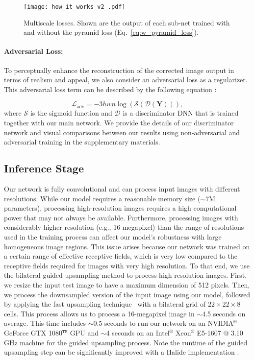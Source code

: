 \documentclass[final]{cvpr}
\begin{document}
\begin{figure}[b]
\centering
\texttt{[image: how\_it\_works\_v2\_.pdf]}
\vspace{-6mm}
\caption{Multiscale losses. Shown are the output of each sub-net trained with and without the pyramid loss (Eq.\ \ref{eq:w_pyramid_loss}).}
\label{fig:how_it_works}
\end{figure}

\paragraph{Adversarial Loss:} To perceptually enhance the reconstruction of the corrected image output in terms of realism and appeal, we also consider an adversarial loss as a regularizer.
This adversarial loss term can be described by the following equation \cite{goodfellow2014generative}:

\begin{equation}
\label{eq:w_adv_loss}
\mathcal{L}_{\text{adv}} = -3hwn \log\left(\mathcal{S}\left(\mathcal{D}\left(\mathbf{Y}\right)\right)\right),
\end{equation}
where $\mathcal{S}$ is the sigmoid function and $\mathcal{D}$ is a discriminator DNN that is trained together with our main network. We provide the details of our discriminator network and visual comparisons between our results using non-adversarial and adversarial training in the supplementary materials.

\subsection{Inference Stage}\label{subsec:Inference}

Our network is fully convolutional and can process input images with different resolutions. While our model requires a reasonable memory size ($\sim$7M parameters), processing high-resolution images requires a high computational power that may not always be available. Furthermore, processing images with considerably higher resolution (e.g., 16-megapixel) than the range of resolutions used in the training process can affect our model's robustness with large homogeneous image regions. This issue arises because our network was trained on a certain range of effective receptive fields, which is very low compared to the receptive fields required for images with very high resolution. To that end, we use the bilateral guided upsampling method \cite{chen2016bilateral} to process high-resolution images. First, we resize the input test image to have a maximum dimension of 512 pixels. Then, we process the downsampled version of the input image using our model, followed by applying the fast upsampling technique~\cite{chen2016bilateral} with a bilateral grid of $22\!\times\!22\!\times\!8$ cells. This process allows us to process a 16-megapixel image in $\sim$4.5 seconds on average. This time includes $\sim$0.5 seconds to run our network on an NVIDIA$^\circledR$ GeForce GTX 1080$^\texttt{TM}$ GPU and $\sim$4 seconds on an Intel$^\circledR$ Xeon$^\circledR$ E5-1607 @ 3.10 GHz machine for the guided upsampling process. Note the runtime of the guided upsampling step can be significantly improved with a Halide implementation \cite{HALIDE}.
\end{document}
